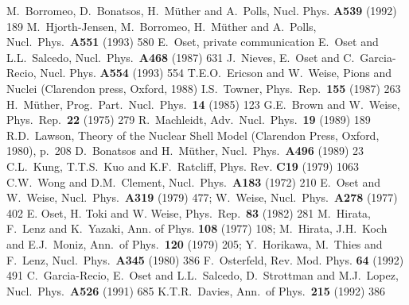 
\footnotesize{\begin{thebibliography}{99}
 M.\ Borromeo, D.\ Bonatsos, H.\ M\"{u}ther and A.\ Polls,
Nucl. Phys. {\bf A539} (1992) 189
 M.\ Hjorth-Jensen, M.\ Borromeo, H.\ M\"{u}ther
and A.\ Polls,
Nucl.\ Phys.\ {\bf  A551} (1993) 580
 E.\ Oset, private communication
 E.\ Oset and L.L.\ Salcedo, Nucl.\ Phys.\ {\bf A468} (1987) 631
 J.\ Nieves, E.\ Oset and C.\ Garcia-Recio,
Nucl. Phys. {\bf A554} (1993) 554
 T.E.O.\ Ericson and W.\ Weise, Pions and Nuclei
(Clarendon press, Oxford, 1988)
 I.S.\ Towner, Phys.\ Rep.\ {\bf 155} (1987) 263
 H.\ M\"{u}ther, Prog.\ Part.\ Nucl.\ Phys.\ {\bf 14} (1985) 123
 G.E.\ Brown and W.\ Weise, Phys.\ Rep.\ {\bf 22} (1975) 279
 R.\ Machleidt, Adv.\ Nucl.\ Phys.\ {\bf 19} (1989) 189
 R.D.\ Lawson, Theory of the Nuclear Shell Model
(Clarendon Press, Oxford, 1980), p.\ 208
 D.\ Bonatsos and H.\ M\"{u}ther, Nucl.\ Phys.\ {\bf A496} (1989) 23
 C.L.\ Kung, T.T.S.\ Kuo and K.F.\ Ratcliff, Phys. Rev.
{\bf C19} (1979) 1063
 C.W.\ Wong and D.M.\ Clement, Nucl.\ Phys.\ {\bf A183} (1972) 210
 E.\ Oset and W.\ Weise, Nucl.\ Phys.\ {\bf A319} (1979) 477;
W.\ Weise, Nucl.\ Phys.\ {\bf A278} (1977) 402
 E. Oset, H. Toki and W. Weise, Phys.\ Rep.\ {\bf 83} (1982) 281
 M.\ Hirata, F.\ Lenz and K.\ Yazaki, Ann. of Phys. 
{\bf 108} (1977) 108; M.\ Hirata, J.H.\ Koch and E.J.\ Moniz, Ann.\ of Phys.\
{\bf 120} (1979) 205; Y.\ Horikawa, M.\ Thies and F.\ Lenz, Nucl.\ Phys.\
{\bf A345} (1980) 386
\bibitem{ost92} F.\ Osterfeld, Rev. Mod. Phys. {\bf 64} (1992) 491
\bibitem{garc91} C.\ Garcia-Recio, E.\ Oset and L.L.\ Salcedo, D.\ Strottman
and M.J.\ Lopez, Nucl.\ Phys.\ {\bf A526} (1991) 685
\bibitem{dav92} K.T.R.\ Davies, Ann.\ of Phys.\ {\bf 215} (1992) 386
\end{thebibliography}}

